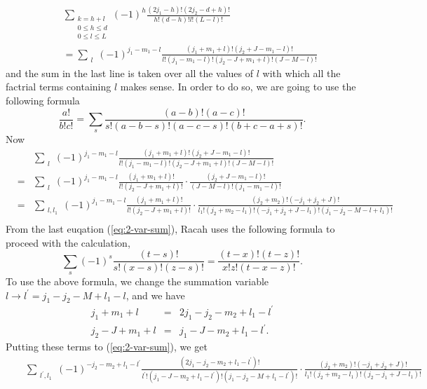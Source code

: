 \documentclass{article}
\begin{document}
{\begin{eqnarray}
&&\sum_{\substack{k=h+l\\0\le h \le d\\0\le l \le L}}  (-1)^h \frac{(2j_1-h)!(2j_2-d+h)!}{h!(d-h)!l!(L-l)!} \nonumber\\ 
&&=\sum_{\substack{l}} (-1)^{j_1 -m_1 -l} \frac{(j_1+m_1+l)!(j_2+J-m_1-l)!}{l!(j_1-m_1-l)!(j_2-J+m_1+l)!(J-M-l)!} \nonumber
\end{eqnarray}
and the sum in the last line is taken over all the values of $l$ with which all the factrial terms containing $l$ makes sense. In order to do so, we are going to use the following formula
\begin{equation}
\label{eq:factorial-triad}
\frac{a!}{b!c!}= \sum_{s} \frac{(a-b)!(a-c)!}{s!(a-b-s)!(a-c-s)!(b+c-a+s)!}.
\end{equation}
Now
\begin{eqnarray}
\label{eq:2-var-sum}
& &\sum_{\substack{l}} (-1)^{j_1 -m_1 -l} \frac{(j_1+m_1+l)!(j_2+J-m_1-l)!}{l!(j_1-m_1-l)!(j_2-J+m_1+l)!(J-M-l)!}   \nonumber\\
& = &  \sum_{\substack{l}} (-1)^{j_1 -m_1 -l} \frac{(j_1+m_1+l)!}{l!(j_2-J+m_1+l)!}\cdot\frac{(j_2+J-m_1-l)!}{(J-M-l)!(j_1-m_1-l)!} \nonumber\\
& = &  \sum_{\substack{l,l_1}} (-1)^{j_1 -m_1 -l} \frac{(j_1+m_1+l)!}{l!(j_2-J+m_1+l)!}\cdot\frac{(j_2+m_2)!(-j_1+j_2+J)!}{l_1!(j_2+m_2-l_1)!(-j_1+j_2+J-l_1)!(j_1-j_2-M-l+l_1)!} \nonumber\\
\end{eqnarray}
From the last euqation (\ref{eq:2-var-sum}), Racah uses the following formula to proceed with the calculation,
\begin{equation}
\label{eq:alternating-factorial}
\sum_{s} (-1)^{s}\frac{(t-s)!}{s!(x-s)!(z-s)!}= \frac{(t-x)!(t-z)!}{x!z!(t-x-z)!}.
\end{equation}
To use the above formula, we change the summation variable $l \rightarrow l^{\prime} =j_1-j_2 - M +l_1 - l$, and we have
\begin{eqnarray}
j_1+m_1+l & = & 2j_1 - j_2 - m_2 + l_1 - l^{\prime} \nonumber\\
j_2-J+m_1+l & = & j_1 - J - m_2 + l_1 - l^{\prime}.  \nonumber
\end{eqnarray}
Putting these terms to (\ref{eq:2-var-sum}), we get
\begin{eqnarray}
& &  \sum_{\substack{l^{\prime},l_1}} (-1)^{-j_2 - m_2 +l_1 -l^{\prime}} \frac{(2j_1 - j_2 - m_2 + l_1 - l^{\prime} )!}{l^{\prime}!(j_1 - J - m_2 + l_1 - l^{\prime} )!(j_1-j_2-M+l_1-l^{\prime})!}\cdot\frac{(j_2+m_2)!(-j_1+j_2+J)!}{l_1!(j_2+m_2-l_1)!(j_2-j_1+J-l_1)!} \nonumber\\

\end{eqnarray}}
\end{document}
